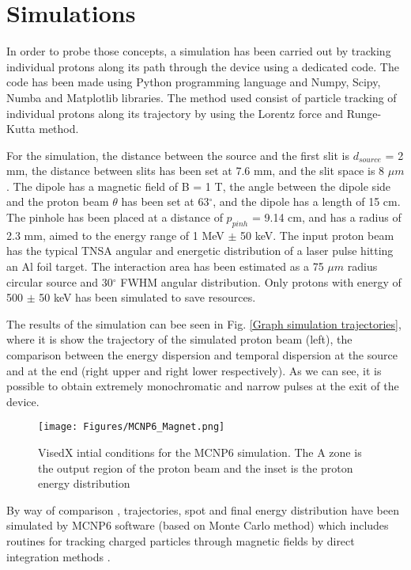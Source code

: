 \documentclass{cup-hpl}
\begin{document}
\section{Simulations}
In order to probe those concepts, a simulation has been carried out by tracking individual protons along its path through the device using a dedicated code. The code has been made using Python programming language and Numpy, Scipy, Numba and Matplotlib libraries. The method used consist of particle tracking of individual protons along its trajectory by using the Lorentz force and Runge-Kutta method.

For the simulation, the distance between the source and the first slit is $d_{source}$ = 2 mm, the distance between slits has been set at 7.6 mm, and the slit space is 8 $\mu m$. The dipole has a magnetic field of B = 1 T, the angle between the dipole side and the proton beam $\theta$ has been set at 63$^\circ$, and the dipole has a length of 15 cm. The pinhole has been placed at a distance of $p_{pinh}$ = 9.14 cm, and has a radius of 2.3 mm, aimed to the energy range of 1 MeV $\pm$ 50 keV. The input proton beam has the typical TNSA angular and energetic distribution of a laser pulse hitting an Al foil target. The interaction area has been estimated as a  75 $\mu m$ radius circular source and 30$^\circ$ FWHM angular distribution. Only protons with energy of 500 $\pm$ 50 keV has been simulated to save resources. 

The results of the simulation can bee seen in Fig. \ref{Graph simulation trajectories}, where it is show the trajectory of the simulated proton beam (left), the comparison between the energy dispersion and temporal dispersion at the source and at the end (right upper and right lower respectively). As we can see, it is possible to obtain extremely monochromatic and narrow pulses at the exit of the device.

\begin{figure}[t]
	\centering
		\texttt{[image: Figures/MCNP6\_Magnet.png]}%
	\caption{VisedX intial conditions for the MCNP6 simulation. The A zone is the output region of the proton beam and the inset is the proton energy distribution }
\label{MCNP6_Magnet}
\end{figure}
By way of comparison , trajectories, spot and final energy distribution have been simulated by MCNP6 software (based on Monte Carlo method) which includes routines for tracking charged particles through magnetic fields by direct integration methods \cite{bull2011magnetic}. 
\end{document}
